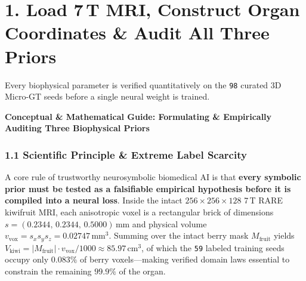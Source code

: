 \documentclass[10pt,a4paper]{article}
\renewcommand{\_}{\origunderscore\allowbreak}
\begin{document}
\section*{1. Load 7\,T MRI, Construct Organ Coordinates \& Audit All Three Priors}

Every biophysical parameter is verified quantitatively on the \texttt{98} curated 3D Micro-GT seeds before a single neural weight is trained.

\begin{guidehdr}
{\small\bfseries\color{kiwigreen!75!black}Conceptual \& Mathematical Guide: Formulating \& Empirically Auditing Three Biophysical Priors}
\end{guidehdr}

\subsubsection*{1.1 Scientific Principle \& Extreme Label Scarcity}
A core rule of trustworthy neurosymbolic biomedical AI is that \textbf{every symbolic prior must be tested as a falsifiable empirical hypothesis before it is compiled into a neural loss}. Inside the intact $256 \times 256 \times 128$ 7\,T RARE kiwifruit MRI, each anisotropic voxel is a rectangular brick of dimensions $s = (0.2344,\, 0.2344,\, 0.5000)\,\text{mm}$ and physical volume $v_{\text{vox}} = s_x s_y s_z = 0.02747\,\text{mm}^3$. Summing over the intact berry mask $M_{\text{fruit}}$ yields $V_{\text{kiwi}} = |M_{\text{fruit}}| \cdot v_{\text{vox}} / 1000 \approx 85.97\,\text{cm}^3$, of which the \texttt{59} labeled training seeds occupy only \textbf{$0.083\%$} of berry voxels---making verified domain laws essential to constrain the remaining $99.9\%$ of the organ.
\end{document}
